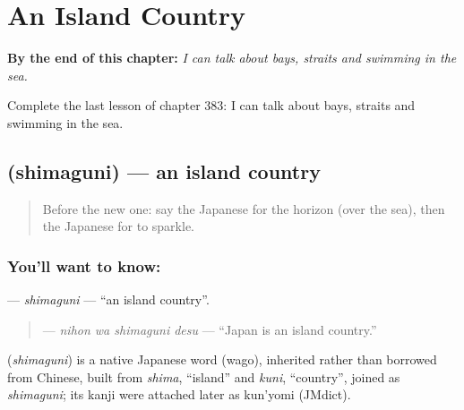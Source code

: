 
\chapter{An Island Country}
\label{ch:ja-an-island-country}

\begin{chapteropening}
\textbf{By the end of this chapter:} \emph{I can talk about bays, straits and swimming in the sea.}

Complete the last lesson of chapter 383: I can talk about bays, straits and swimming in the sea.
\end{chapteropening}

\section[\texorpdfstring{\ja{しまぐに} (shimaguni)}{しまぐに (shimaguni)}]{ (shimaguni) — an island country}

\label{lesson:JA-C383-shimaguni}



\begin{quote}
Before the new one: say the Japanese for the horizon (over the sea), then the Japanese for to sparkle.
\end{quote}

\subsection*{You'll want to know: }
\textbf{} — \emph{shimaguni} — \textquotedblleft{}an island country\textquotedblright{}.

\begin{quote}
\textbf{ } — \emph{nihon wa shimaguni desu} — \textquotedblleft{}Japan is an island country.\textquotedblright{}
\end{quote}

\begin{cousinweb}
\textbf{} (\emph{shimaguni}) is a native Japanese word (wago), inherited rather than borrowed from Chinese, built from \emph{shima}, \textquotedblleft{}island\textquotedblright{} and \emph{kuni}, \textquotedblleft{}country\textquotedblright{}, joined as \emph{shimaguni}; its kanji were attached later as kun'yomi (JMdict).
\end{cousinweb}

